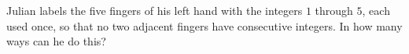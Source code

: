 Julian labels the five fingers of his left hand with the integers $1$ through $5$, each used once, so that no two adjacent fingers have consecutive integers. In how many ways can he do this?
